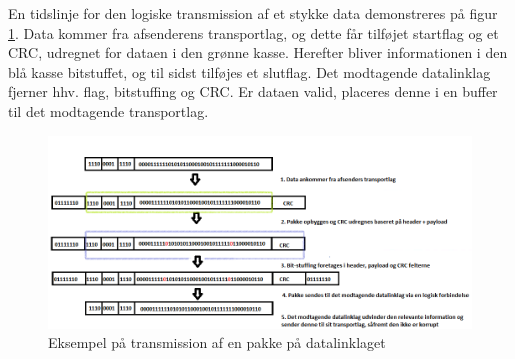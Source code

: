 En tidslinje for den logiske transmission af et stykke data demonstreres på figur \ref{fig:DataLinkExample}. Data kommer fra afsenderens transportlag, og dette får tilføjet startflag og et CRC, udregnet for dataen i den grønne kasse. Herefter bliver informationen i den blå kasse bitstuffet, og til sidst tilføjes et slutflag. Det modtagende datalinklag fjerner hhv. flag, bitstuffing og CRC. Er dataen valid, placeres denne i en buffer til det modtagende transportlag.

\begin{figure}[h!]
\centering
\includegraphics[scale=0.6]{Billeder/DataLinkExample.PNG}
\caption{Eksempel på transmission af en pakke på datalinklaget}
\label{fig:DataLinkExample}
\end{figure}